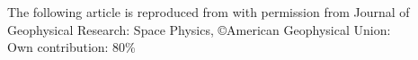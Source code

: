 
\newpage

The following article is reproduced from \textcite{Forstner-2020} with permission from Journal of Geophysical Research: Space Physics, \copyright American Geophysical Union:\\

\hfill Own contribution: 80\%

%